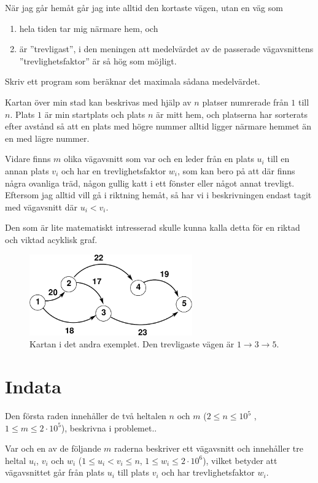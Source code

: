 När jag går hemåt går jag inte alltid den kortaste vägen, utan en väg som
\begin{enumerate}
    \item hela tiden tar mig närmare hem, och
    \item är ''trevligast'', i den meningen att medelvärdet av de passerade vägavsnittens ''trevlighetsfaktor'' är så hög som möjligt.
\end{enumerate}
Skriv ett program som beräknar det maximala sådana medelvärdet.

Kartan över min stad kan beskrivas med hjälp av $n$ platser numrerade från $1$ till $n$. Plats $1$ är min startplats och plats $n$ är mitt hem, och platserna har sorterats efter avstånd så att en plats med högre nummer alltid ligger närmare hemmet än en med lägre nummer.

Vidare finns $m$ olika vägavsnitt som var och en leder från en plats $u_i$ till en annan plats $v_i$ och har en trevlighetsfaktor $w_i$, som kan bero på att där finns några ovanliga träd, någon gullig katt i ett fönster eller något annat trevligt. Eftersom jag alltid vill gå i riktning hemåt, så har vi i beskrivningen endast tagit med vägavsnitt där $u_i<v_i$.

Den som är lite matematiskt intresserad skulle kunna kalla detta för en riktad och viktad acyklisk graf.

\begin{figure}[h]
    \includegraphics[width=7cm]{trevlig.pdf}
    \caption{Kartan i det andra exemplet. Den trevligaste vägen är $1\rightarrow 3\rightarrow 5$.}
\end{figure}

\section*{Indata}
Den första raden innehåller de två heltalen $n$ och $m$ ($2 \leq n \leq 10^5$ , $1 \leq m \leq 2\cdot 10^5$), beskrivna i problemet..

Var och en av de följande $m$ raderna beskriver ett vägavsnitt och innehåller tre heltal $u_i$, $v_i$ och $w_i$ ($1 \leq u_i < v_i \leq n$, $1 \le w_i \le 2\cdot 10^6$),
vilket betyder att vägavsnittet går från plats $u_i$ till plats $v_i$ och har trevlighetsfaktor $w_i$.

